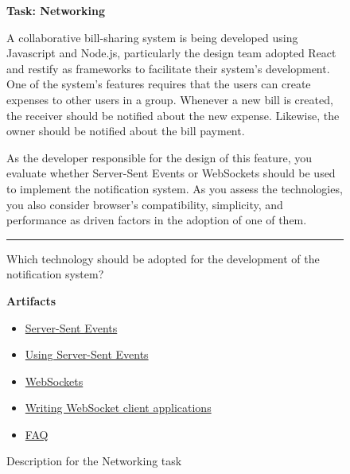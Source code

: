 \begin{figure}
\begin{mdframed}[backgroundcolor=gray!04] 
\begin{scriptsize}

{\large \textbf{Task: Networking}} \bigskip


A collaborative bill-sharing system is being developed using Javascript and Node.js, particularly the
design team adopted React and restify as frameworks to facilitate their system's development. One of the
system's features requires that the users can create expenses to other users in a group. Whenever a new
bill is created, the receiver should be notified about the new expense. Likewise, the owner should be
notified about the bill payment. \medskip

As the developer responsible for the design of this feature, you evaluate whether Server-Sent Events
or WebSockets should be used to implement the notification system. As you assess the technologies,
you also consider browser's compatibility, simplicity, and performance as driven factors in the adoption of
one of them.


\begin{center}
\rule{10cm}{0.4pt}
\end{center}

Which technology should be adopted for the development of the notification system?

\medskip

\textbf{Artifacts}

\begin{itemize}
    \item \href{https://developer.mozilla.org/en-US/docs/Web/API/EventSource}{Server-Sent Events}
    \item \href{https://developer.mozilla.org/en-US/docs/Web/API/Server-sent_events/Using_server-sent_events}{Using Server-Sent Events}
    \item \href{https://developer.mozilla.org/en-US/docs/Web/API/WebSockets_API}{WebSockets}
    \item \href{https://developer.mozilla.org/en-US/docs/Web/API/WebSockets_API/Writing_WebSocket_client_applications}{Writing WebSocket client applications}
    \item \href{https://stackoverflow.com/questions/5195452/websockets-vs-server-sent-events-eventsource}{FAQ}
\end{itemize}

\end{scriptsize}
\end{mdframed}
\caption{Description for the Networking task}
\end{figure}

    
